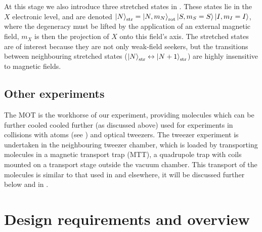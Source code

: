 
At this stage we also introduce three stretched states in \CaF{}. These states
lie in the $X$ electronic level, and are denoted $\ket{N}_\text{str} = \ket{N,
m_N}_\text{rot}\ket{S, m_S=S}\ket{I,m_I=I}$, where the degeneracy must be
lifted by the application of an external magnetic field, $m_X$ is then the
projection of $X$ onto this field's axis. The stretched states are of interest
because they are not only weak-field seekers, but the transitions between
neighbouring stretched states
($\ket{N}_\text{str}\leftrightarrow\ket{N+1}_\text{str}$) are highly
insensitive to magnetic fields.


\subsection*{Other experiments}

The \CaF{} MOT is the workhorse of our experiment, providing molecules which
can be further cooled cooled further (as discussed above) used for experiments
in collisions with \Rb{} atoms (see ) and optical tweezers. The tweezer experiment is
undertaken in the neighbouring tweezer chamber, which is loaded by transporting
molecules in a magnetic transport trap (MTT), a quadrupole trap with coils
mounted on a transport stage outside the vacuum chamber. This transport of the
molecules is similar to that used in
 and elsewhere, it will be
discussed further below and in .


\section{Design requirements and overview}


